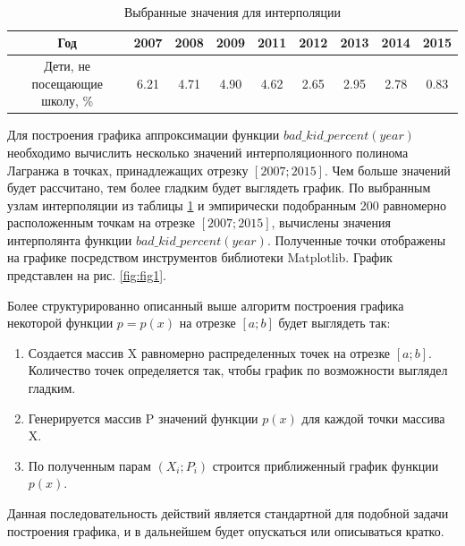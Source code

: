 
\begin{table}[htbp]
\centering
\captionsetup{singlelinecheck=false}
\caption{\\ Выбранные значения для интерполяции}
\begin{tabular}{ |c|c|c|c|c|c|c|c|c| } 
 \hline
 Год & 2007 & 2008 & 2009 & 2011 & 2012 & 2013 & 2014 & 2015 \\
 \hline
 Дети, не посещающие школу, \% & 6.21 & 4.71 & 4.90 & 4.62 & 2.65 & 2.95 & 2.78 & 0.83 \\ 
 \hline
\end{tabular}
\label{tab:table1}
\end{table}

Для построения графика аппроксимации функции $bad\_kid\_percent(year)$ необходимо вычислить несколько значений интерполяционного полинома Лагранжа в точках, принадлежащих отрезку $[2007;2015]$. Чем больше значений будет рассчитано, тем более гладким будет выглядеть график. По выбранным узлам интерполяции из таблицы \ref{tab:table1} и эмпирически подобранным 200 равномерно расположенным точкам на отрезке $[2007;2015]$, вычислены значения интерполянта функции $bad\_kid\_percent(year)$. Полученные точки отображены на графике посредством инструментов библиотеки Matplotlib. График представлен на рис. \ref{fig:fig1}.

Более структурированно описанный выше алгоритм построения графика некоторой функции $p=p(x)$ на отрезке $[a;b]$ будет выглядеть так:
\begin{enumerate}
    \item Создается массив X равномерно распределенных точек на отрезке $[a;b]$. Количество точек определяется так, чтобы график по возможности выглядел гладким.
    \item Генерируется массив P значений функции $p(x)$ для каждой точки массива X.
    \item По полученным парам $(X_i;P_i)$ строится приближенный график функции $p(x)$.
\end{enumerate}
Данная последовательность действий является стандартной для подобной задачи построения графика, и в дальнейшем будет опускаться или описываться кратко.

